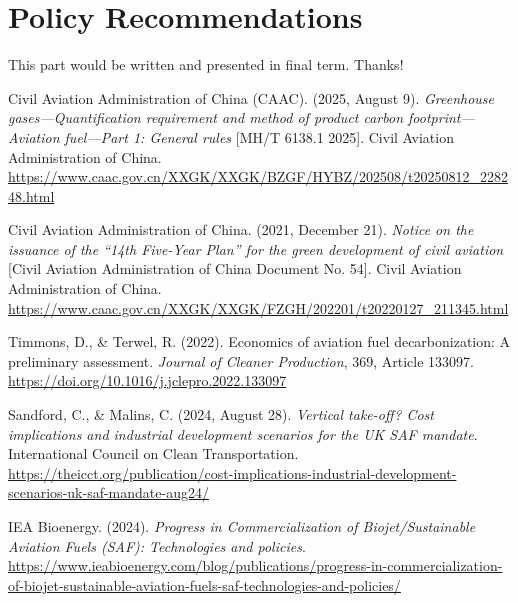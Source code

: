 \documentclass[a4paper,11pt]{article}
\begin{document}

\section{Policy Recommendations}
This part would be written and presented in final term. Thanks!

\newpage
\begin{thebibliography}{9}

Civil Aviation Administration of China (CAAC). (2025, August 9). \textit{Greenhouse gases---Quantification requirement and method of product carbon footprint---Aviation fuel---Part 1: General rules} [MH/T 6138.1 2025]. Civil Aviation Administration of China.
\url{https://www.caac.gov.cn/XXGK/XXGK/BZGF/HYBZ/202508/t20250812_228248.html    }

Civil Aviation Administration of China. (2021, December 21). \textit{Notice on the issuance of the ``14th Five-Year Plan'' for the green development of civil aviation} [Civil Aviation Administration of China Document No. 54]. Civil Aviation Administration of China.
\url{https://www.caac.gov.cn/XXGK/XXGK/FZGH/202201/t20220127_211345.html    }

Timmons, D., \& Terwel, R. (2022). Economics of aviation fuel decarbonization: A preliminary assessment. \textit{Journal of Cleaner Production}, 369, Article 133097.
\url{https://doi.org/10.1016/j.jclepro.2022.133097    }

Sandford, C., \& Malins, C. (2024, August 28). \textit{Vertical take-off? Cost implications and industrial development scenarios for the UK SAF mandate}. International Council on Clean Transportation.
\url{https://theicct.org/publication/cost-implications-industrial-development-scenarios-uk-saf-mandate-aug24/    }

IEA Bioenergy. (2024). \textit{Progress in Commercialization of Biojet/Sustainable Aviation Fuels (SAF): Technologies and policies}.
\url{https://www.ieabioenergy.com/blog/publications/progress-in-commercialization-of-biojet-sustainable-aviation-fuels-saf-technologies-and-policies/    }


\end{thebibliography}
\end{document}
